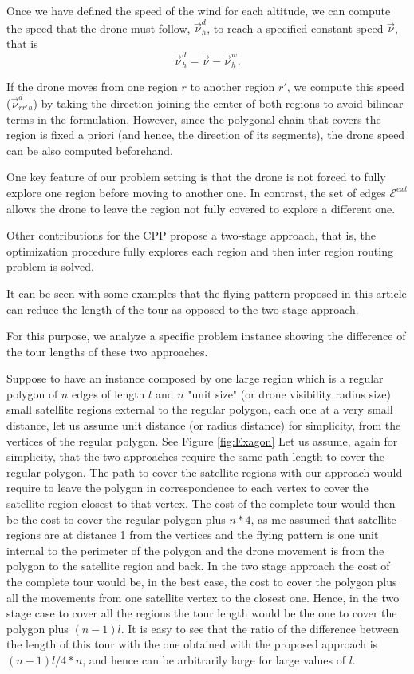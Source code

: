 \documentclass[12pt]{elsarticle}
\begin{document}
Once we have defined the speed of the wind for each altitude, we can compute the speed that  the drone must follow, $\vec{\nu}_h^d$, to reach a specified constant speed $\vec{\nu}$, that is $$\vec{\nu}_h^d = \vec{\nu} - \vec{\nu}_h^w.$$

If the drone moves from one region $r$ to another region $r'$, we compute this speed ($\vec{\nu }_{rr'h}^d$) by taking the direction joining the center of both regions to avoid bilinear terms in the formulation. However, since the polygonal chain that covers the region is fixed a priori (and hence, the direction of its segments), the drone speed can be also computed beforehand. 

One key feature of our problem setting is that 
the drone is not forced to fully explore one region before moving to another one. In contrast, the set of edges $\mathcal E^{ext}$ allows the drone to leave the region not fully covered to explore a different one. 

Other contributions for the CPP propose a two-stage approach, that is,  the optimization procedure fully explores each region and then inter region routing problem is solved.



It can be seen with some examples that the flying pattern proposed in this article can reduce the length of the tour as opposed to the two-stage approach.

For this purpose, we analyze a specific problem instance showing the difference of the tour lengths of these two approaches.

Suppose to have an instance composed by  one large region which is a regular polygon of $n$ edges of length $l$ and $n$ "unit size" (or drone visibility radius size) small satellite regions external to the regular polygon, each one at a very small distance, let us assume unit distance (or radius distance) for simplicity, from the vertices of the regular polygon. See Figure \ref{fig:Exagon} Let us assume, again for simplicity, that the two approaches require the same path length to cover the regular polygon. The path to cover the satellite regions with our approach would require to leave the polygon in correspondence to each vertex to cover the  satellite region closest to that vertex. The cost of the complete tour would then be the cost to cover the regular polygon plus $n*4$, as me assumed that satellite regions are at distance 1 from the vertices and the flying pattern is one unit internal to the perimeter of the polygon and the drone movement is from the polygon to the satellite region and back. In the two stage approach the cost of the complete tour would be, in the best case, the cost to cover the polygon plus all the movements from one satellite vertex to the closest one. Hence, in the two stage case to cover all the regions the tour length would be the one to cover the polygon plus $(n-1)l$. It is easy to see that the ratio of the difference between the length of this tour with the one obtained with the proposed approach is $(n-1)l/4*n$, and hence can be arbitrarily large for large values of $l$.
\end{document}
